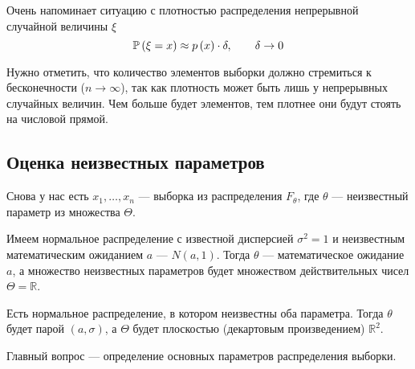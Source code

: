 Очень напоминает ситуацию с плотностью распределения
непрерывной случайной величины $\xi$
$$\mathbb{P}\left( \xi=x \right)\approx p\left(x\right)\cdot\delta,\qquad\delta\to 0$$

Нужно отметить, что количество элементов выборки
должно стремиться к бесконечности ($n\to\infty$),
так как плотность может быть лишь у непрерывных случайных величин.
Чем больше будет элементов,
тем плотнее они будут стоять на числовой прямой.

\subsection{Оценка неизвестных параметров}
Снова у нас есть $x_1, \dots, x_n$ --- выборка из распределения $F_\theta$,
где $\theta$ --- неизвестный параметр из множества $\Theta$.

\begin{example}
  Имеем нормальное распределение с известной дисперсией $\sigma^2 = 1$
  и неизвестным математическим ожиданием $a$ --- $N\left(a,1\right)$.
  Тогда $\theta$ --- математическое ожидание $a$, а множество неизвестных
  параметров будет множеством действительных чисел $\Theta = \mathbb{R}$.
\end{example}
\begin{example}
  Есть нормальное распределение, в котором неизвестны оба параметра.
  Тогда $\theta$ будет парой $(a,\sigma)$, а $\Theta$ будет плоскостью
  (декартовым произведением) $\mathbb{R}^2$.
\end{example}

Главный вопрос --- определение основных параметров распределения выборки.

